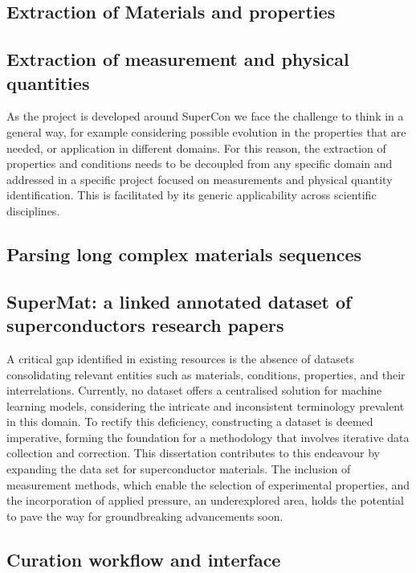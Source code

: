 \subsection{Extraction of Materials and properties}



\subsection{Extraction of measurement and physical quantities}
As the project is developed around SuperCon we face the challenge to think in a general way, for example considering possible evolution in the properties that are needed, or application in different domains. For this reason, the extraction of properties and conditions needs to be decoupled from any specific domain and addressed in a specific project focused on measurements and physical quantity identification.
This is facilitated by its generic applicability across scientific disciplines. 

\subsection{Parsing long complex materials sequences}

\subsection{SuperMat: a linked annotated dataset of superconductors research papers}
A critical gap identified in existing resources is the absence of datasets consolidating relevant entities such as materials, conditions, properties, and their interrelations. 
Currently, no dataset offers a centralised solution for machine learning models, considering the intricate and inconsistent terminology prevalent in this domain. 
To rectify this deficiency, constructing a dataset is deemed imperative, forming the foundation for a methodology that involves iterative data collection and correction. This dissertation contributes to this endeavour by expanding the data set for superconductor materials. 
The inclusion of measurement methods, which enable the selection of experimental properties, and the incorporation of applied pressure, an underexplored area, holds the potential to pave the way for groundbreaking advancements soon.


\subsection{Curation workflow and interface}

